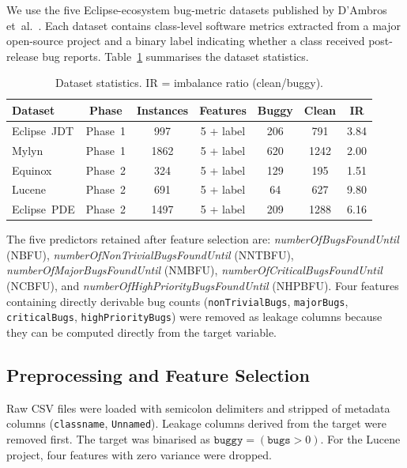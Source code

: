 \documentclass[12pt, a4paper]{article}
\begin{document}
We use the five Eclipse-ecosystem bug-metric datasets published by D'Ambros
et~al.~\cite{dambros2012}. Each dataset contains class-level software metrics
extracted from a major open-source project and a binary label indicating
whether a class received post-release bug reports.
Table~\ref{tab:datasets} summarises the dataset statistics.

\begin{table}[H]
\caption{Dataset statistics. IR = imbalance ratio (clean/buggy).}
\label{tab:datasets}
\centering
\small
\renewcommand{\arraystretch}{1.2}
\begin{tabular}{@{}lcccccc@{}}
\toprule
\textbf{Dataset} & \textbf{Phase} & \textbf{Instances}
  & \textbf{Features} & \textbf{Buggy} & \textbf{Clean} & \textbf{IR} \\
\midrule
Eclipse~JDT & Phase~1 & 997  & 5 + label & 206 & 791  & 3.84 \\
Mylyn       & Phase~1 & 1862 & 5 + label & 620 & 1242 & 2.00 \\
Equinox     & Phase~2 & 324  & 5 + label & 129 & 195  & 1.51 \\
Lucene      & Phase~2 & 691  & 5 + label & 64  & 627  & 9.80 \\
Eclipse~PDE & Phase~2 & 1497 & 5 + label & 209 & 1288 & 6.16 \\
\bottomrule
\end{tabular}
\end{table}

The five predictors retained after feature selection are:
\textit{numberOfBugsFoundUntil} (NBFU),
\textit{numberOfNonTrivialBugsFoundUntil} (NNTBFU),
\textit{numberOfMajorBugsFoundUntil} (NMBFU),
\textit{numberOfCriticalBugsFoundUntil} (NCBFU), and
\textit{numberOfHighPriorityBugsFoundUntil} (NHPBFU).
Four features containing directly derivable bug counts
(\texttt{nonTrivialBugs}, \texttt{majorBugs}, \texttt{criticalBugs},
\texttt{highPriorityBugs}) were removed as leakage columns because they
can be computed directly from the target variable.

\subsection{Preprocessing and Feature Selection}
\label{sec:preproc}

Raw CSV files were loaded with semicolon delimiters and stripped of metadata
columns (\texttt{classname}, \texttt{Unnamed}). Leakage columns derived from
the target were removed first. The target was binarised as
$\texttt{buggy} = (\texttt{bugs} > 0)$. For the Lucene project, four
features with zero variance were dropped.
\end{document}
